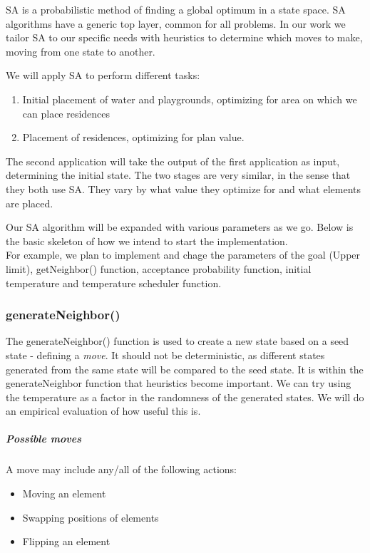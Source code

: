 \documentclass{article}
\begin{document}
SA is a probabilistic method of finding a global optimum in a state space. SA algorithms have a generic top layer, common for all problems. In our work we tailor SA to our specific needs with heuristics to determine which moves to make, moving from one state to another. 

We will apply SA to perform different tasks: 

\begin{enumerate}
    \item Initial placement of water and playgrounds, optimizing for area on which we can place residences
    \item Placement of residences, optimizing for plan value.
\end{enumerate}  

The second application will take the output of the first application as input, determining the initial state. The two stages are very similar, in the sense that they both use SA. They vary by what value they optimize for and what elements are placed. 

Our SA algorithm will be expanded with various parameters as we go. Below is the basic skeleton of how we intend to start the implementation. \\ For example, we plan to implement and chage the parameters of the goal (Upper limit), getNeighbor() function, acceptance probability function, initial temperature and temperature scheduler function.%

\subsubsection{generateNeighbor()}

The generateNeighbor() function is used to create a new state based on a seed state - defining a \textit{move}. It should not be deterministic, as different states generated from the same state will be compared to the seed state. It is within the generateNeighbor function that heuristics become important. We can try using the temperature as a factor in the randomness of the generated states. We will do an empirical evaluation of how useful this is.

\subparagraph{Possible moves}

A move may include any/all of the following actions:
\begin{itemize}
    \item Moving an element
    \item Swapping positions of elements  
    \item Flipping an element
\end{itemize}
\end{document}

